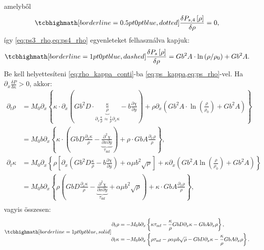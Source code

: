 \documentclass[10pt,a4paper]{scrartcl}
\begin{document}
amelyből
\begin{equation} \label{eq:ps4_rho}
\tcbhighmath[borderline={0.5pt}{0pt}{blue,dotted}]{\frac{{{\delta P_{s,4}}\left[ \rho  \right]}}{{\delta \rho }} =  0,}
\end{equation}
így \cref{eq:ps3_rho,eq:ps4_rho} egyenleteket felhasználva kapjuk:
\begin{equation} \label{eq:ps_rho}
\tcbhighmath[borderline={1pt}{0pt}{blue,dashed}]{\frac{{{\delta P_s}\left[ \rho  \right]}}{{\delta \rho }} = G{b^2}A \cdot \ln \left( {\rho /{\rho _0}} \right) + G{b^2}A .}
\end{equation}
Be kell helyettesíteni \cref{eq:rho_kappa_conti}-ba \cref{eq:ps_kappa,eq:ps_rho}-vel. Ha ${{\partial _x}\frac{{\delta P}}{{\delta \kappa }}} > 0$, akkor:
\[\begin{aligned}
  {\partial _t}\rho  &  = {M_0}{\partial _x}\left\{ {\kappa  \cdot {\partial _x}\left( {G{b^2}D \cdot \underbrace {\frac{\kappa }{\rho }}_{{\partial _x}\frac{\kappa }{\rho } \approx \frac{1}{\rho }{\partial _x}\kappa } - b\frac{{\partial \chi }}{{\partial y}}} \right) + \rho {\partial _x}\left( {G{b^2}A \cdot \ln \left( {\frac{\rho }{{{\rho _0}}}} \right) + G{b^2}A} \right)} \right\} \\ 
   &  = {M_0}b{\partial _x}\left\{ {\kappa  \cdot \left( {GbD\frac{{{\partial _x}\kappa }}{\rho } - \underbrace {\frac{{{\partial ^2}\chi }}{{\partial x\partial y}}}_{{\tau _{{\text{mf}}}}}} \right) + \rho  \cdot GbA\frac{{{\partial _x}\rho }}{\rho }} \right\}, \\ 
  {\partial _t}\kappa  &  = {M_0}{\partial _x}\left\{ {\rho \left[ {{\partial _x}\left( {G{b^2}D\frac{\kappa }{\rho } - b\frac{{\partial \chi }}{{\partial y}}} \right) + \alpha \mu {b^2}\sqrt \rho } \right] + \kappa {\partial _x}\left( {G{b^2}A\ln \left( {\frac{\rho }{{{\rho _0}}}} \right) + G{b^2}A} \right)} \right\} \\ 
   &  = {M_0}b{\partial _x}\left\{ {\rho \left( {GbD\frac{{{\partial _x}\kappa }}{\rho } - \underbrace {\frac{{{\partial ^2}\chi }}{{\partial x\partial y}}}_{{\tau _{{\text{mf}}}}} + \alpha \mu {b^2}\sqrt \rho } \right) + \kappa  \cdot GbA\frac{{{\partial _x}\rho }}{\rho }} \right\}, \\ 
\end{aligned} \]
vagyis összesen:
\begin{gather} \label{eq:rho_kappa}
\tcbhighmath[borderline={1pt}{0pt}{blue,solid}]{
\begin{aligned}
  {\partial _t}\rho  &  =  - {M_0}b{\partial _x}\left\{ {\kappa {\tau _{{\text{mf}}}} - \frac{\kappa }{\rho }GbD{\partial _x}\kappa  - GbA{\partial _x}\rho } \right\}, \\ 
  {\partial _t}\kappa  &  =  - {M_0}b{\partial _x}\left\{ {\rho {\tau _{{\text{mf}}}} - \rho \alpha \mu b\sqrt \rho - GbD{\partial _x}\kappa  - \frac{\kappa }{\rho } GbA{\partial _x}\rho } \right\}.
  \end{aligned}}
\end{gather}
\end{document}
